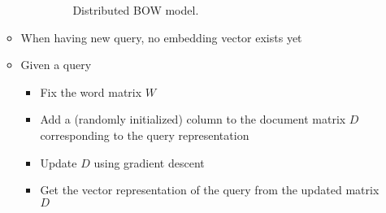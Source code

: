 \begin{itemize}
\begin{itemize}
\begin{itemize}
\begin{figure}[ht]
				\caption{Distributed BOW model. }
				\label{img:neural_model_distributed_BOW}
			\end{figure}
		\end{itemize}
		\item When having new query, no embedding vector exists yet
		\item Given a query
		\begin{itemize}
			\item Fix the word matrix $W$
			\item Add a (randomly initialized) column to the document matrix $D$ corresponding to the query representation
			\item Update $D$ using gradient descent
			\item Get the vector representation of the query from the updated matrix $D$
		\end{itemize}
	\end{itemize}
\end{itemize}